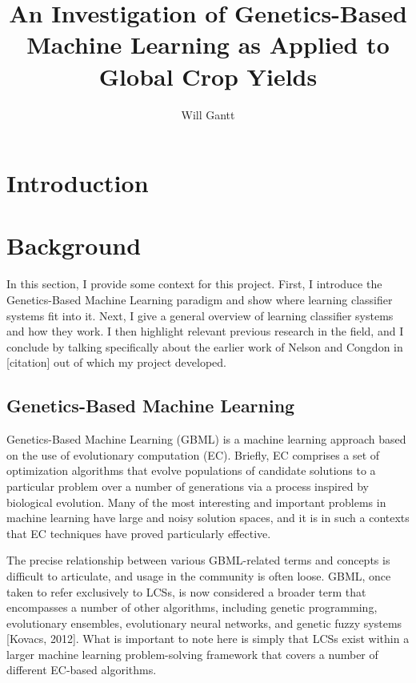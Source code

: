 \documentclass[11pt]{article}
\begin{document}
\title{An Investigation of Genetics-Based Machine Learning as Applied to Global Crop Yields}
\author{Will Gantt}
\maketitle

\section{Introduction}
\section{Background}

In this section, I provide some context for this project. First, I introduce the Genetics-Based Machine Learning paradigm and show where learning classifier systems fit into it. Next, I give a general overview of learning classifier systems and how they work. I then highlight relevant previous research in the field, and I conclude by talking specifically about the earlier work of Nelson and Congdon in [citation] out of which my project developed.

\subsection{Genetics-Based Machine Learning}

Genetics-Based Machine Learning (GBML) is a machine learning approach based on the use of evolutionary computation (EC). Briefly, EC comprises a set of optimization algorithms that evolve populations of candidate solutions to a particular problem over a number of generations via a process inspired by biological evolution. Many of the most interesting and important problems in machine learning have large and noisy solution spaces, and it is in such a contexts that EC techniques have proved particularly effective.

The precise relationship between various GBML-related terms and concepts is difficult to articulate, and usage in the community is often loose. GBML, once taken to refer exclusively to LCSs, is now considered a broader term that encompasses a number of other algorithms, including genetic programming, evolutionary ensembles, evolutionary neural networks, and genetic fuzzy systems [Kovacs, 2012]. What is important to note here is simply that LCSs exist within a larger machine learning problem-solving framework that covers a number of different EC-based algorithms.
\end{document}
